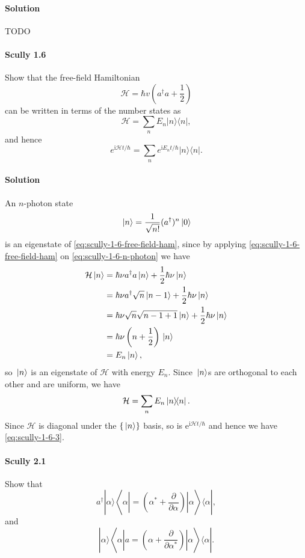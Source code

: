 \documentclass[hyperref, a4paper]{article}
\newcommand*{\ii}{\mathrm{i}}
\newcommand*{\ee}{\mathrm{e}}
\newcommand{\mathscr}{\mathcal}
\begin{document}
\paragraph{Solution} TODO

\paragraph{Scully 1.6} Show that the free-field Hamiltonian
\begin{equation}
    \mathscr{H}=\hbar v\left(a^{\dagger} a+\frac{1}{2}\right)
    \label{eq:scully-1-6-free-field-ham}
\end{equation}
can be written in terms of the number states as
\[
\mathscr{H}=\sum_{n} E_{n}|n\rangle\langle n|,
\]
and hence
\begin{equation}
    e^{\ii \mathscr{H} t / \hbar}=\sum_{n} e^{\ii E_{n} t / \hbar}|n\rangle\langle n|.
    \label{eq:scully-1-6-3}
\end{equation}

\paragraph{Solution} An $n$-photon state
\begin{equation}
    \ket*{n} = \frac{1}{\sqrt{n!}} (a^\dagger)^n \ket*{0}
    \label{eq:scully-1-6-n-photon}
\end{equation}
is an eigenstate of \eqref{eq:scully-1-6-free-field-ham}, since by applying \eqref{eq:scully-1-6-free-field-ham} on \eqref{eq:scully-1-6-n-photon} we have
\[
    \begin{aligned}
        \mathcal{H} \ket*{n} &= \hbar \nu a^\dagger a \ket*{n} + \frac{1}{2} \hbar \nu \ket*{n} \\
        &= \hbar \nu a^\dagger \sqrt{n} \ket*{n-1} + \frac{1}{2} \hbar \nu \ket*{n} \\
        &= \hbar \nu \sqrt{n} \sqrt{n-1+1} \ket*{n} + \frac{1}{2} \hbar \nu \ket*{n} \\
        &= \hbar \nu \left( n + \frac{1}{2} \right) \ket*{n} \\
        &= E_n \ket*{n},
    \end{aligned}
\]
so $\ket*{n}$ is an eigenstate of $\mathcal{H}$ with energy $E_n$.
Since $\ket*{n}$s are orthogonal to each other and are uniform, we have
\begin{equation}
    \mathcal{H} = \sum_n E_n \dyad*{n}.
\end{equation}
Since $\mathcal{H}$ is diagonal under the $\{\ket*{n}\}$ basis, so is $\ee^{\ii \mathcal{H} t / \hbar}$ and hence we have \eqref{eq:scully-1-6-3}.

\paragraph{Scully 2.1} Show that
\[
a^{\dagger}|\alpha\rangle\left\langle\alpha\left|=\left(\alpha^{*}+\frac{\partial}{\partial \alpha}\right)\right| \alpha\right\rangle\langle\alpha|,
\]
and
\[
|\alpha\rangle\left\langle\alpha\left|a=\left(\alpha+\frac{\partial}{\partial \alpha^{*}}\right)\right| \alpha\right\rangle\langle\alpha|.
\]
\end{document}
